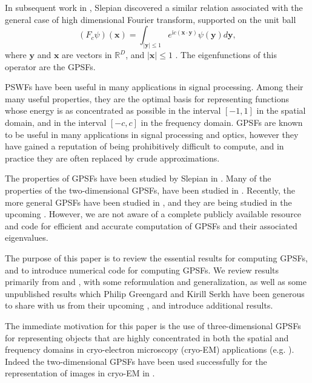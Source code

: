 \documentclass[12pt]{article}
\begin{document}
In subsequent work in \cite{slepian1964prolate}, Slepian discovered a similar relation associated with the general case of 
high dimensional Fourier transform, supported on the unit ball
\begin{equation}
 \left( {F}_c \psi\right)({\bm x}) =    \int_{|{\bm y}| \leq 1} e^{ \mathrm{i} c \left( {\bm{x}} \cdot {\bm{y}} \right) } \psi(\bm{y})  {d}\bm{y} ,
\end{equation}
where ${\bm y}$ and ${\bm x}$ are vectors in $\mathbb{R}^D$, and $ |{\bm x}| \leq 1 $ .
The eigenfunctions of this operator are the GPSFs. 

PSWFs have been useful in many applications in signal processing. Among their many useful properties, they are the optimal basis for representing functions whose energy is as concentrated as possible in the interval $[-1,1]$ in the spatial domain, and in the interval $[-c,c]$ in the frequency domain. 
GPSFs are known to be useful in many applications in signal processing and optics, however they have gained a reputation of being prohibitively difficult to compute, and in practice they are often replaced by crude approximations. 

The properties of GPSFs have been studied by Slepian in \cite{slepian1964prolate}. Many of the properties of the two-dimensional GPSFs, have been studied in \cite{shkolnisky2007prolate,shkolnisky2006approximation}.
Recently, the more general GPSFs have been studied in \cite{serkh2015generalized}, and they are being studied in the upcoming \cite{greengard2017generalized}.
However, we are not aware of a complete publicly available resource and code for efficient and accurate computation of GPSFs and their associated eigenvalues.

The purpose of this paper is to review the essential results for computing GPSFs, and to introduce numerical code for computing GPSFs.
We review results primarily from \cite{slepian1964prolate,shkolnisky2007prolate} and \cite{serkh2015generalized}, with some reformulation and generalization, as well as some unpublished results which Philip Greengard and Kirill Serkh have been generous to share with us from their upcoming \cite{greengard2017generalized}, and introduce additional  results. 


The immediate motivation for this paper is the use of three-dimensional GPSFs for representing objects that are highly concentrated in both the spatial and frequency domains in cryo-electron microscopy (cryo-EM) applications (e.g. \cite{lederman2016representation,lederman2017continuously}). 
Indeed the two-dimensional GPSFs have been used successfully for the representation of images in cryo-EM in \cite{landa2017approximation,landa2017steerable}. 
\end{document}
